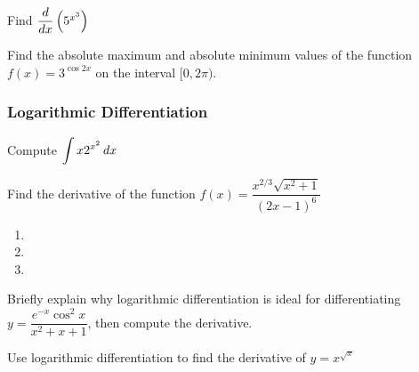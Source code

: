 \documentclass[notes]{subfiles}
\begin{document}
		\begin{ex}
			Find $\dfrac{d}{dx}\left( 5^{x^3}\right)$
		\end{ex}	
			
		\begin{ex}
			Find the absolute maximum and absolute minimum values of the function $f(x) = 3^{\cos 2x}$ on the interval $[0,2\pi)$.
		\end{ex}
			\newpage
	
	\subsubsection*{Logarithmic Differentiation}
		
		\begin{ex}
			Compute $\displaystyle \int x2^{x^2}\, dx$
		\end{ex}	
			
		\begin{ex}
			Find the derivative of the function $f(x) = \dfrac{x^{2/3}\sqrt{x^2+1}}{(2x-1)^6}$
		\end{ex}	
			\newpage
		
		\begin{rmk}
			\begin{enumerate}
				\setlength\itemsep{30pt}
				\item 
				\item 
				\item 
			\end{enumerate}
		\end{rmk}
			
		\begin{ex}
			Briefly explain why logarithmic differentiation is ideal for differentiating $y = \dfrac{e^{-x}\cos^2x}{x^2+x+1}$, then compute the derivative.
		\end{ex}
			\newpage
			
		\begin{ex}
			Use logarithmic differentiation to find the derivative of $y = x^{\sqrt{x}}$
		\end{ex}
		
\end{document}
